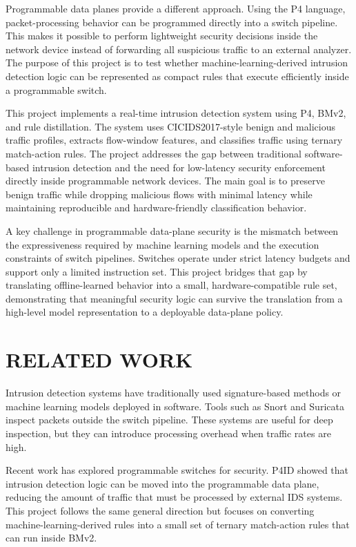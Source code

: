 \documentclass[conference]{IEEEtran}
\begin{document}
Programmable data planes provide a different approach.
Using the P4 language, packet-processing behavior can be
programmed directly into a switch pipeline. This makes it
possible to perform lightweight security decisions inside the
network device instead of forwarding all suspicious traffic to
an external analyzer. The purpose of this project is to test
whether machine-learning-derived intrusion detection logic
can be represented as compact rules that execute efficiently
inside a programmable switch.

This project implements a real-time intrusion detection
system using P4, BMv2, and rule distillation. The system
uses CICIDS2017-style benign and malicious traffic profiles,
extracts flow-window features, and classifies traffic using
ternary match-action rules. The project addresses the gap
between traditional software-based intrusion detection and
the need for low-latency security enforcement directly inside
programmable network devices. The main goal is to preserve
benign traffic while dropping malicious flows with minimal
latency while maintaining reproducible and hardware-friendly
classification behavior.

A key challenge in programmable data-plane security is
the mismatch between the expressiveness required by machine
learning models and the execution constraints of switch
pipelines. Switches operate under strict latency budgets and
support only a limited instruction set. This project bridges that
gap by translating offline-learned behavior into a small,
hardware-compatible rule set, demonstrating that meaningful
security logic can survive the translation from a high-level
model representation to a deployable data-plane policy.

\section{RELATED WORK}

Intrusion detection systems have traditionally used
signature-based methods or machine learning models
deployed in software. Tools such as Snort and Suricata
inspect packets outside the switch pipeline. These systems are
useful for deep inspection, but they can introduce processing
overhead when traffic rates are high.

Recent work has explored programmable switches for
security. P4ID showed that intrusion detection logic can be
moved into the programmable data plane, reducing the amount
of traffic that must be processed by external IDS systems.
This project follows the same general direction but focuses on
converting machine-learning-derived rules into a small set of
ternary match-action rules that can run inside BMv2.
\end{document}
